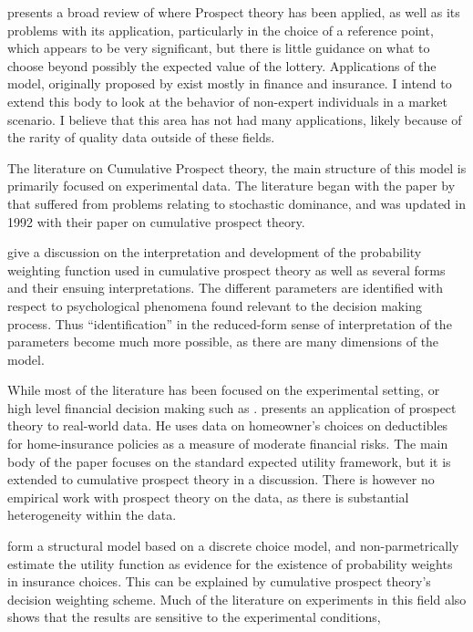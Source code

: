 \documentclass[12pt]{paper}
\begin{document}
\cite*{LitReview} presents a broad review of where Prospect theory has
been applied, as well as its problems with its application,
particularly in the choice of a reference point, which appears to be
very significant, but there is little guidance on what to choose
beyond possibly the expected value of the lottery. Applications of the
model, originally proposed by \cite*{Kahn} exist mostly in finance and
insurance. I intend to extend this body to look at the behavior of
non-expert individuals in a market scenario. I believe that this area
has not had many applications, likely because of the rarity of quality
data outside of these fields.

The literature on Cumulative Prospect theory, the main structure of
this model is primarily focused on experimental data. The literature
began with the paper by \cite*{ProspectTheory} that suffered from
problems relating to stochastic dominance, and was updated in 1992
with their paper on cumulative prospect theory. 

\cite*{GONZALEZ1999129} give a discussion on the interpretation and
development of the probability weighting function used in cumulative
prospect theory as well as several forms and their ensuing
interpretations. The different parameters are identified with respect
to psychological phenomena found relevant to the decision making
process. Thus ``identification'' in the reduced-form sense of
interpretation of the parameters become much more possible, as there
are many dimensions of the model.

While most of the literature has been focused on the experimental
setting, or high level financial decision making such as \cite*{Thaler1995}.
\cite*{Sydnor2010} presents an application of prospect theory to real-world
data. He uses data on homeowner's choices on deductibles for
home-insurance policies as a measure of moderate financial risks. The
main body of the paper focuses on the standard expected utility
framework, but it is extended to cumulative prospect theory in a
discussion. There is however no empirical work with prospect theory on
the data, as there is substantial heterogeneity within the data.

\cite*{Barseghyan2012} form a structural model based on a discrete
choice model, and non-parmetrically estimate the utility function as
evidence for the existence of probability weights in insurance
choices. This can be explained by cumulative prospect theory's
decision weighting scheme. Much of the literature on experiments in
this field also shows that the results are sensitive to the
experimental conditions, \cite*{PlottZeiler}
\end{document}
